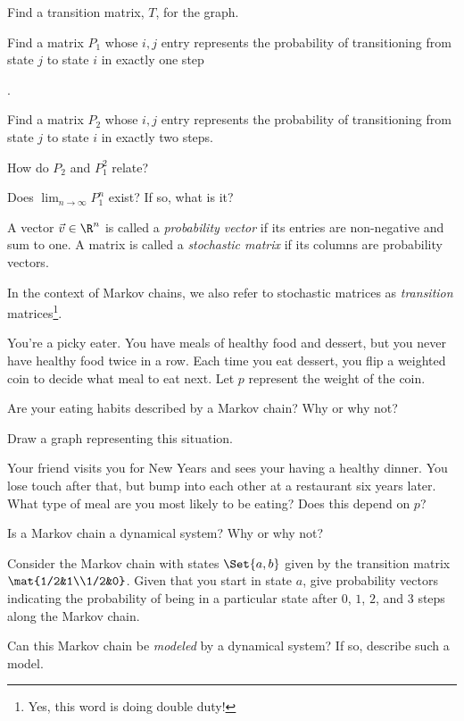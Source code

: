 	\begin{parts}
		\item Find a transition matrix, $T$, for the graph.
		\item Find a matrix $P_1$ whose $i,j$ entry represents the probability
			of transitioning from state $j$ to state $i$ in exactly one step	\newpage

			\newpage.
		\item Find a matrix $P_2$ whose $i,j$ entry represents the probability
			of transitioning from state $j$ to state $i$ in exactly two steps.
		\item How do $P_2$ and $P_1^2$ relate?
		\item Does $\lim_{n\to\infty} P_1^n$ exist? If so, what is it?
	\end{parts}

	\begin{definition}
		A vector $\vec v\in \R^n$ is called a \emph{probability vector} if its entries are non-negative and sum to
		one. A matrix is called a \emph{stochastic matrix} if its columns are probability vectors.
	\end{definition}

	In the context of Markov chains, we also refer to stochastic matrices as \emph{transition} matrices\footnote{ Yes, this word
	is doing double duty!}.

	\question
	You're a picky eater. You have meals of healthy food and dessert, but you never have healthy food twice in a row.
	Each time you eat dessert, you flip a weighted coin to decide what meal to eat next. Let $p$ represent the weight of
	the coin.
	\begin{parts}
		\item Are your eating habits described by a Markov chain? Why or why not?
		\item Draw a graph representing this situation.
		\item Your friend visits you for New Years and sees your having a healthy dinner. You lose touch
			after that, but bump into each other at a restaurant six years later. What type of meal are
			you most likely to be eating? Does this depend on $p$?
	\end{parts}

	\question
	\begin{parts}
		\item Is a Markov chain a dynamical system? Why or why not?
		\item Consider the Markov chain with states $\Set{a,b}$
			given by the transition matrix $\mat{1/2&1\\1/2&0}$. Given 
			that you start in state $a$, give probability vectors indicating the 
			probability of being in a particular state after $0$, $1$, $2$, and $3$ steps
			along the Markov chain.
		\item Can this Markov chain be \emph{modeled} by a dynamical system? If so, describe
			such a model.
	\end{parts}

